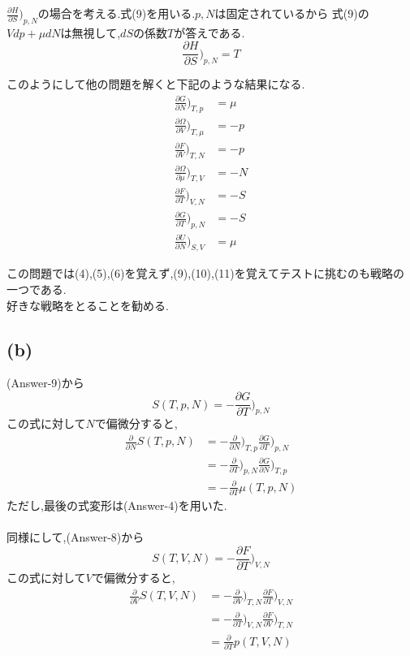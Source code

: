 $\frac{\partial H}{\partial S}\big)_{p,N}$の場合を考える.式(9)を用いる.$p,N$は固定されているから
式(9)の$Vdp +\mu dN $は無視して,$dS$の係数$T$が答えである.
\begin{equation}
  \frac{\partial H}{\partial S}\big)_{p,N} = T \tag{Answer-3}
\end{equation}

このようにして他の問題を解くと下記のような結果になる.
\begin{align}
  \frac{\partial G}{\partial N}\bigg)_{T,p} &= \mu \tag{Answer-4} \\
  \frac{\partial \Omega}{\partial V}\bigg)_{T,\mu} &= -p \tag{Answer-5} \\
  \frac{\partial F}{\partial V}\bigg)_{T,N} &= -p \tag{Answer-6} \\
  \frac{\partial \Omega}{\partial \mu}\bigg)_{T,V} &= -N \tag{Answer-7} \\
  \frac{\partial F}{\partial T}\bigg)_{V,N} &= -S \tag{Answer-8} \\
  \frac{\partial G}{\partial T}\bigg)_{p,N} &= -S \tag{Answer-9} \\
  \frac{\partial U}{\partial N}\bigg)_{S,V} &= \mu \tag{Answer-10}
\end{align}

\color{red}この問題では(4),(5),(6)を覚えず,(9),(10),(11)を覚えてテストに挑むのも戦略の一つである.\\
好きな戦略をとることを勧める.
\color{black}



\subsection*{(b)}
(Answer-9)から
\[S(T,p,N) = -\frac{\partial G}{\partial T}\bigg)_{p,N}\]
この式に対して$N$で偏微分すると,
\begin{align*}
  \frac{\partial}{\partial N} S(T,p,N)
  &=-\frac{\partial}{\partial N}\bigg)_{T,p} \frac{\partial G}{\partial T}\bigg)_{p,N}\\
  &= -\frac{\partial}{\partial T}\bigg)_{p,N} \frac{\partial G}{\partial N}\bigg)_{T,p}\\
  &=-\frac{\partial}{\partial T} \mu (T,p,N)
\end{align*}
ただし,最後の式変形は(Answer-4)を用いた.\\\\
同様にして,(Answer-8)から
\[S(T,V,N) = -\frac{\partial F}{\partial T}\bigg)_{V,N}\]
この式に対して$V$で偏微分すると,
\begin{align*}
  \frac{\partial}{\partial V} S(T,V,N)
  &=-\frac{\partial}{\partial V}\bigg)_{T,N} \frac{\partial F}{\partial T}\bigg)_{V,N}\\
  &= -\frac{\partial}{\partial T}\bigg)_{V,N} \frac{\partial F}{\partial V}\bigg)_{T,N}\\
  &=\frac{\partial}{\partial T} p(T,V,N)
\end{align*}


